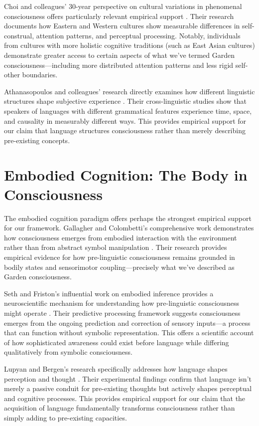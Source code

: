 Choi and colleagues' 30-year perspective on cultural variations in phenomenal consciousness offers particularly relevant empirical support \parencite{choi2023cultural}. Their research documents how Eastern and Western cultures show measurable differences in self-construal, attention patterns, and perceptual processing. Notably, individuals from cultures with more holistic cognitive traditions (such as East Asian cultures) demonstrate greater access to certain aspects of what we've termed Garden consciousness—including more distributed attention patterns and less rigid self-other boundaries.

Athanasopoulos and colleagues' research directly examines how different linguistic structures shape subjective experience \parencite{athanasopoulos2025linguistic}. Their cross-linguistic studies show that speakers of languages with different grammatical features experience time, space, and causality in measurably different ways. This provides empirical support for our claim that language structures consciousness rather than merely describing pre-existing concepts.

\section{Embodied Cognition: The Body in Consciousness}

The embodied cognition paradigm offers perhaps the strongest empirical support for our framework. Gallagher and Colombetti's comprehensive work demonstrates how consciousness emerges from embodied interaction with the environment rather than from abstract symbol manipulation \parencite{gallagher2024enactive}. Their research provides empirical evidence for how pre-linguistic consciousness remains grounded in bodily states and sensorimotor coupling—precisely what we've described as Garden consciousness.

Seth and Friston's influential work on embodied inference provides a neuroscientific mechanism for understanding how pre-linguistic consciousness might operate \parencite{seth2023embodied}. Their predictive processing framework suggests consciousness emerges from the ongoing prediction and correction of sensory inputs—a process that can function without symbolic representation. This offers a scientific account of how sophisticated awareness could exist before language while differing qualitatively from symbolic consciousness.

Lupyan and Bergen's research specifically addresses how language shapes perception and thought \parencite{lupyan2023language}. Their experimental findings confirm that language isn't merely a passive conduit for pre-existing thoughts but actively shapes perceptual and cognitive processes. This provides empirical support for our claim that the acquisition of language fundamentally transforms consciousness rather than simply adding to pre-existing capacities.

